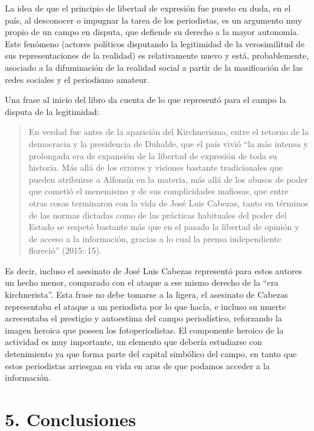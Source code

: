 La idea de que el principio de libertad de expresión fue puesto en duda, en el país, al desconocer o impugnar la tarea de los periodistas, es un argumento muy propio de un campo en disputa, que defiende su derecho a la mayor autonomía. Este fenómeno (actores políticos disputando la legitimidad de la verosimilitud de sus representaciones de la realidad) es relativamente nuevo y está, probablemente, asociado a la difuminación de la realidad social a partir de la masificación de las redes sociales y el periodismo amateur.

Una frase al inicio del libro da cuenta de lo que representó para el campo la disputa de la legitimidad:

\begin{quote}
En verdad fue antes de la aparición del Kirchnerismo, entre el retorno de la democracia y la presidencia de Duhalde, que el país vivió \enquote{la más intensa y prolongada era de expansión de la libertad de expresión de toda su historia. Más allá de los errores y visiones bastante tradicionales que pueden atribuirse a Alfonsín en la materia, más allá de los abusos de poder que cometió el menemismo y de sus complicidades mafiosas, que entre otras cosas terminaron con la vida de José Luis Cabezas, tanto en términos de las normas dictadas como de las prácticas habituales del poder del Estado se respetó bastante más que en el pasado la libertad de opinión y de acceso a la información, gracias a lo cual la prensa independiente floreció} (2015: 15).
\end{quote}

Es decir, incluso el asesinato de José Luis Cabezas representó para estos autores un hecho menor, comparado con el ataque a ese mismo derecho de la \enquote{era kirchnerista}. Esta frase no debe tomarse a la ligera, el asesinato de Cabezas representaba el ataque a un periodista por lo que hacía, e incluso su muerte acrecentaba el prestigio y autoestima del campo periodístico, reforzando la imagen heroica que poseen los fotoperiodistas. El componente heroico de la actividad es muy importante, un elemento que debería estudiarse con detenimiento ya que forma parte del capital simbólico del campo, en tanto que estos periodistas arriesgan su vida en aras de que podamos acceder a la información.

\backmatter

\chapter{5. Conclusiones}

